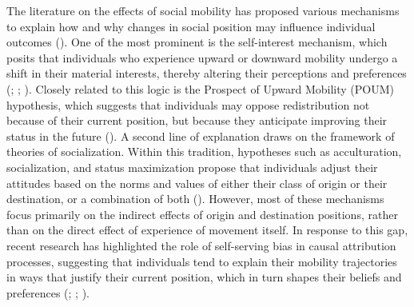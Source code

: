 \documentclass[
  13pt,
]{article}
\begin{document}
The literature on the effects of social mobility has proposed various
mechanisms to explain how and why changes in social position may
influence individual outcomes
(). One of the
most prominent is the self-interest mechanism, which posits that
individuals who experience upward or downward mobility undergo a shift
in their material interests, thereby altering their perceptions and
preferences (;
;
).
Closely related to this logic is the Prospect of Upward Mobility (POUM)
hypothesis, which suggests that individuals may oppose redistribution
not because of their current position, but because they anticipate
improving their status in the future
(). A second line
of explanation draws on the framework of theories of socialization.
Within this tradition, hypotheses such as acculturation, socialization,
and status maximization propose that individuals adjust their attitudes
based on the norms and values of either their class of origin or their
destination, or a combination of both
(). However, most of these mechanisms focus
primarily on the indirect effects of origin and destination positions,
rather than on the direct effect of experience of movement itself. In
response to this gap, recent research has highlighted the role of
self-serving bias in causal attribution processes, suggesting that
individuals tend to explain their mobility trajectories in ways that
justify their current position, which in turn shapes their beliefs and
preferences
(;
;
).
\end{document}
